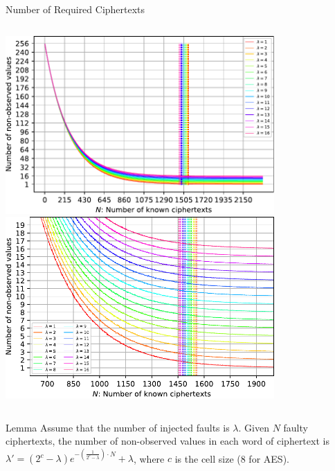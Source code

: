 \documentclass[table,aspectratio=169]{beamer}
\begin{document}
\begin{frame}{Number of Required Ciphertexts}
\vspace{-0.4cm}
\begin{columns}[onlytextwidth]
\centering
\includegraphics[width=0.77\textwidth]{./figures/overview_diagram_of_non_observed_values.pdf}
\centering
\includegraphics[width=0.77\textwidth]{./figures/close_up_diagram_of_non_observed_values.pdf}
\end{columns}
\begin{block}{Lemma}
\footnotesize
Assume that the number of injected faults is $\lambda$. 
Given $N$ faulty ciphertexts, the number of non-observed values in each word of ciphertext is
$\lambda' = \left(2^{c} - \lambda\right) e^{-\left(\frac{1}{2^{c} - \lambda}\right)\cdot N} + \lambda$, where $c$ is the cell size (8 for AES).
\end{block}
\end{frame}
\end{document}
